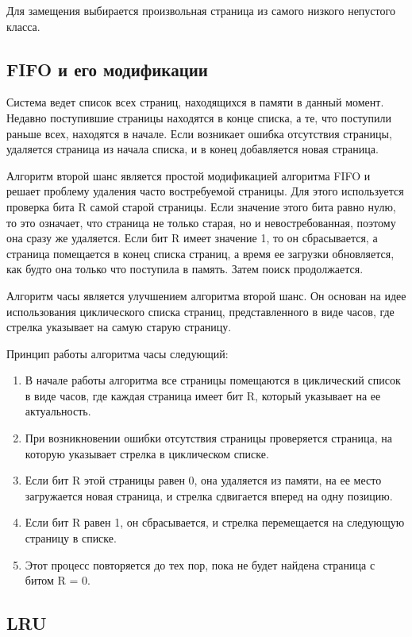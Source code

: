 Для замещения выбирается произвольная страница из самого низкого непустого класса.

\subsection{FIFO и его модификации}

Система ведет список всех страниц, находящихся в памяти в данный момент.
Недавно поступившие страницы находятся в конце
списка, а те, что поступили раньше всех, находятся в начале. 
Если возникает ошибка отсутствия страницы, удаляется страница из начала списка, и в конец добавляется новая страница.

Алгоритм второй шанс является простой модификацией алгоритма FIFO и решает проблему удаления часто востребуемой страницы.
Для этого используется проверка бита R самой старой страницы. 
Если значение этого бита равно нулю, то это означает, что страница не только старая, но и невостребованная, поэтому она сразу же удаляется.
Если бит R имеет значение 1, то он сбрасывается, а страница помещается в конец списка страниц, а время ее загрузки обновляется, как будто она только что поступила в память.
Затем поиск продолжается.

Алгоритм часы является улучшением алгоритма второй шанс.
Он основан на идее использования циклического списка страниц, представленного в виде часов, где стрелка указывает на самую старую страницу.

Принцип работы алгоритма часы следующий:
\begin{enumerate}
	\item В начале работы алгоритма все страницы помещаются в циклический список в виде часов, где каждая страница имеет бит R, который указывает на ее актуальность.
	\item При возникновении ошибки отсутствия страницы проверяется страница, на которую указывает стрелка в циклическом списке.
	\item Если бит R этой страницы равен 0, она удаляется из памяти, на ее место загружается новая страница, и стрелка сдвигается вперед на одну позицию.
	\item Если бит R равен 1, он сбрасывается, и стрелка перемещается на следующую страницу в списке.
	\item Этот процесс повторяется до тех пор, пока не будет найдена страница с битом R = 0.
\end{enumerate}

\subsection{LRU}

